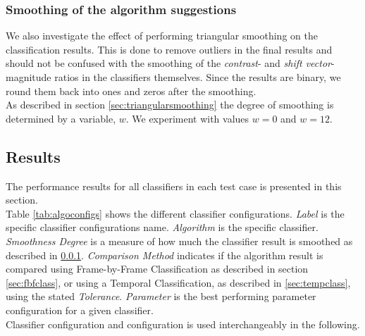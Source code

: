 \subsubsection{Smoothing of the algorithm suggestions}\label{sec:classsmooth}
%
We also investigate the effect of performing triangular smoothing on the classification results. This is done to remove outliers in the final results and should not be confused with the smoothing of the \textit{contrast}- and \textit{shift vector}- magnitude ratios in the classifiers themselves. Since the results are binary, we round them back into ones and zeros after the smoothing.\\
As described in section \ref{sec:triangularsmoothing} the degree of smoothing is determined by a variable, $w$. We experiment with values $w=0$ and $w=12$.
%
\subsection{Results}
%
The performance results for all classifiers in each test case is presented in this section.\\
Table \ref{tab:algoconfigs} shows the different classifier configurations. \textit{Label} is the specific classifier configurations name. \textit{Algorithm} is the specific classifier. \textit{Smoothness Degree} is a measure of how much the classifier result is smoothed as described in \ref{sec:classsmooth}. \textit{Comparison Method} indicates if the algorithm result is compared using Frame-by-Frame Classification as described in section \ref{sec:fbfclass}, or using a Temporal Classification, as described in \ref{sec:tempclass}, using the stated \textit{Tolerance}. \textit{Parameter} is the best performing parameter configuration for a given classifier.\\
Classifier configuration and configuration is used interchangeably in the following.
%
